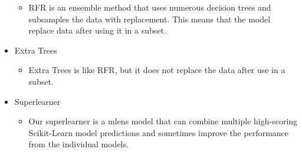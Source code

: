 \documentclass[twocolumn, nofootinbib, secnumarabic, amssymb, nobibnotes, aps, prd]{revtex4-2}
\begin{document}
\begin{itemize}
  \begin{itemize}
  		\item RFR is an ensemble method that uses numerous decision trees and subsamples the data with replacement. This means that the model replace data after using it in a subset.
  \end{itemize}
  \item Extra Trees
  \begin{itemize}
  		\item Extra Trees is like RFR, but it does not replace the data after use in a subset.
  \end{itemize}
  \item Superlearner
  \begin{itemize}
  		\item Our superlearner is a mlens model that can combine multiple high-scoring Scikit-Learn model predictions and sometimes improve the performance from the individual models.
  \end{itemize}
\end{itemize}\label{itm:models}



\end{document}

